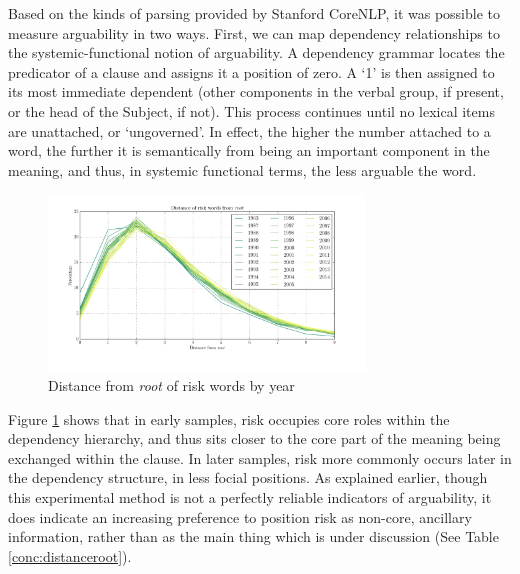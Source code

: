 
Based on the kinds of parsing provided by Stanford CoreNLP, it was possible to measure arguability in two ways. First, we can map dependency relationships to the systemic-functional notion of arguability. A dependency grammar locates the predicator of a clause and assigns it a position of zero. A `1' is then assigned to its most immediate dependent (other components in the verbal group, if present, or the head of the Subject, if not). This process continues until no lexical items are unattached, or `ungoverned'. In effect, the higher the number attached to a word, the further it is semantically from being an important component in the meaning, and thus, in systemic functional terms, the less arguable the word.
%
\begin{figure}[htb!]
\centering
\includegraphics[width=0.75\textwidth]{../images/dist_old_mpl_style}
\caption{Distance from \emph{root} of risk words by year}
\label{fig:depnum}
\end{figure}
%
Figure \ref{fig:depnum} shows that in early samples, risk occupies core roles within the dependency hierarchy, and thus sits closer to the core part of the meaning being exchanged within the clause. In later samples, risk more commonly occurs later in the dependency structure, in less focial positions. As explained earlier, though this experimental method is not a perfectly reliable indicators of arguability, it does indicate an increasing preference to position risk as non-core, ancillary information, rather than as the main thing which is under discussion (See Table \ref{conc:distanceroot}).
%
